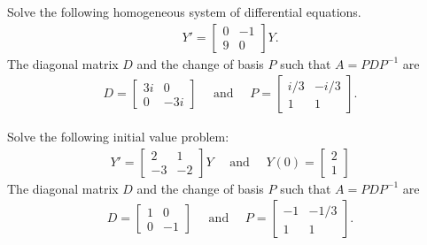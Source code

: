 \documentclass[addpoints, 12pt]{exam}%
\theoremstyle{definition}
\begin{document}
\begin{questions}
	
\newpage
	
\question[20]
Solve the following homogeneous system of differential equations.
	\begin{align*}
	Y' = \begin{bmatrix} 0 & -1 \\ 9 & 0 \end{bmatrix} Y .
	\end{align*}
The diagonal matrix $D$ and the change of basis $P$ such that $A = P D P^{-1}$ are
	\begin{align*}
	D = \begin{bmatrix} 3i & 0 \\ 0 & -3i \end{bmatrix}
	\quad \text{ and } \quad
	P = \begin{bmatrix}
	i/3 & -i/3 \\
	1 & 1
	\end{bmatrix} .
	\end{align*}
	
	
\newpage

\question[20]
Solve the following initial value problem:
	\begin{align*}
	Y' = \left[\begin{matrix}2 & 1\\-3 & -2\end{matrix}\right] Y 
	\quad \text{ and } \quad
	Y(0) = \begin{bmatrix} 2 \\ 1 \end{bmatrix}
	\end{align*}
The diagonal matrix $D$ and the change of basis $P$ such that $A = P D P^{-1}$ are
	\begin{align*}
	D = \begin{bmatrix} 1 & 0 \\ 0 & -1 \end{bmatrix} 
	\quad \text{ and } \quad
	P = \begin{bmatrix} -1 & -1/3 \\
	1 & 1
	\end{bmatrix} .
	\end{align*}
	

\end{questions}
\end{document}
